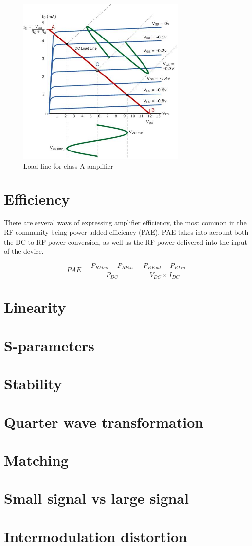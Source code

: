 \begin{figure}[H]
	  \centering
	  \includegraphics[width=0.75\textwidth]{img/Load_line_graphics}
	  \caption{Load line for class A amplifier}
	  \label{fig:fig_Load_line}
\end{figure}

\section{Efficiency}
There are several ways of expressing amplifier efficiency, the most common in the RF community being power added efficiency (PAE). PAE takes into account both the DC to RF power conversion, as well as the RF power delivered into the input of the device.

\begin{equation}
	PAE=\frac{P_{RFout}-P_{RFin}}{P_{DC}}=\frac{P_{RFout}-P_{RFin}}{V_{DC} \times I_{DC}} 
\end{equation}
\section{Linearity}

\section{S-parameters}

\section{Stability}

\section{Quarter wave transformation}

\section{Matching}

\section{Small signal vs large signal}

\section{Intermodulation distortion}
